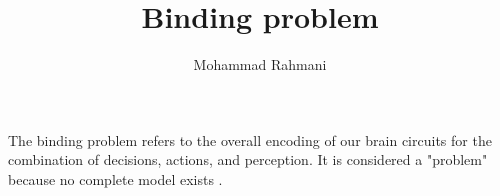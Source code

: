 \documentclass[a4paper]{article}
\title{Binding problem}
\date{}
\author{Mohammad Rahmani}
\begin{document}
    \maketitle
    The binding problem refers to the overall encoding of our brain circuits for the combination of decisions, actions, and perception. It is considered a "problem" because no complete model exists .
    
    
\end{document}
